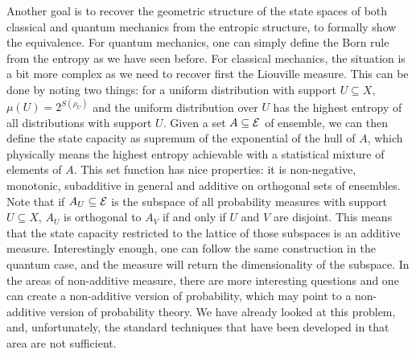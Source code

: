 Another goal is to recover the geometric structure of the state spaces of both classical and quantum mechanics from the entropic structure, to formally show the equivalence. For quantum mechanics, one can simply define the Born rule from the entropy as we have seen before. For classical mechanics, the situation is a bit more complex as we need to recover first the Liouville measure. This can be done by noting two things: for a uniform distribution with support $U \subseteq X$, $\mu(U) = 2^{S(\rho_U)}$ and the uniform distribution over $U$ has the highest entropy of all distributions with support $U$. Given a set $A \subseteq \mathcal{E}$ of ensemble, we can then define the state capacity as supremum of the exponential of the hull of $A$, which physically means the highest entropy achievable with a statistical mixture of elements of $A$. This set function has nice properties: it is non-negative, monotonic, subadditive in general and additive on orthogonal sets of ensembles. Note that if $A_U \subseteq \mathcal{E}$ is the subspace of all probability measures with support $U \subseteq X$, $A_U$ is orthogonal to $A_V$ if and only if $U$ and $V$ are disjoint. This means that the state capacity restricted to the lattice of those subspaces is an additive measure. Interestingly enough, one can follow the same construction in the quantum case, and the measure will return the dimensionality of the subspace. In the areas of non-additive measure, there are more interesting questions and one can create a non-additive version of probability, which may point to a non-additive version of probability theory. We have already looked at this problem, and, unfortunately, the standard techniques that have been developed in that area are not sufficient.

